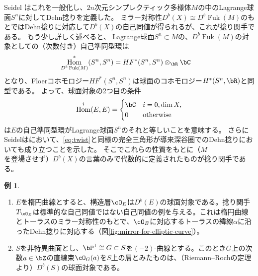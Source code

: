 \documentclass[uplatex,11pt,a4paper,dvipdfmx]{jsarticle}
\numberwithin{equation}{section}
\numberwithin{figure}{section}
\theoremstyle{definition}
\newtheorem{example}[theorem]{例}
\DeclareMathOperator{\Hom}{\mathrm{Hom}}
\DeclareMathOperator{\Fuk}{Fuk}
\begin{document}
Seidel \cite{MR1743463}はこれを一般化し、$2n$次元シンプレクティック多様体$M$の中のLagrange球面$S^n$に対してDehn捻りを定義した。
ミラー対称性$D^b(X) \cong D^b \Fuk(M)$のもとではDehn捻りに対応して$D^b(X)$の自己同値が得られるが、これが捻り関手である。
もう少し詳しく述べると、
Lagrange球面$S^n \subset M$の、$D^b\Fuk(M)$の対象としての（次数付き）自己準同型環は
\begin{align}
    \Hom_{D^b\Fuk(M)}^*(S^n, S^n) & = HF^*(S^n, S^n)\otimes_\bR \bC
\end{align}
となり、Floerコホモロジー$HF^*(S^n, S^n)$は球面のコホモロジー$H^*(S^n, \bR)$と同型である。
よって、球面対象の2つ目の条件$$\Hom^i(E, E) = \begin{cases}
        \bC & i = 0, \dim X,   \\
        0   & \text{otherwise}
    \end{cases}$$は$E$の自己準同型環がLagrange球面$S^n$のそれと等しいことを意味する。
さらにSeidelは\cite{MR1978046}において、\eqref{eq:twist}と同様の完全三角形が導来深谷圏でのDehn捻りにおいても成り立つことを示した。
そこでこれらの性質をもとに（$M$を登場させず）$D^b(X)$の言葉のみで代数的に定義されたものが捻り関手である。
\begin{example}
    \begin{enumerate}
        \item $E$を楕円曲線とすると、構造層$\cO_E$は$D^b(E)$の球面対象である。捻り関手$T_{\cO_E}$は標準的な自己同値ではない自己同値の例を与える。これは楕円曲線とトーラスのミラー対称性のもとで、$\cO_E$に対応するトーラスの緯線$\alpha$に沿ったDehn捻りに対応する（図\ref{fig:mirror-for-elliptic-curve}）。
        \item $S$を非特異曲面とし、$\bP^1 \cong G \subset S$を$(-2)$-曲線とする。このとき$G$上の次数$a \in \bZ$の直線束$\cO_G(a)$を$S$上の層とみたものは、（Riemann--Rochの定理より）$D^b(S)$の球面対象である。
    \end{enumerate}
\end{example}
\end{document}
